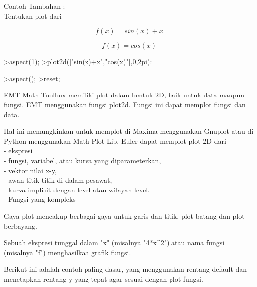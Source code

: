 \documentclass[12pt,arial,letterpaper]{book}
\begin{document}
\begin{eulercomment}
\begin{eulercomment}
\begin{eulercomment}
\begin{eulercomment}
\begin{eulercomment}
\begin{eulercomment}
\begin{eulercomment}
\begin{eulercomment}
\begin{eulercomment}
\begin{eulercomment}
\begin{eulercomment}
\begin{eulercomment}
\begin{eulercomment}
\begin{eulercomment}
\begin{eulercomment}
Contoh Tambahan :\\
Tentukan plot dari\\
\end{eulercomment}
\begin{eulerformula}
\[
f(x)=sin(x)+x
\]
\end{eulerformula}
\begin{eulerformula}
\[
f(x)=cos(x)
\]
\end{eulerformula}
\begin{eulerprompt}
>aspect(1);
>plot2d(["sin(x)+x","cos(x)"],0,2pi):
\end{eulerprompt}
\begin{eulerprompt}
>aspect();
>reset;
\end{eulerprompt}
\begin{eulercomment}
EMT Math Toolbox memiliki plot dalam bentuk 2D, baik untuk data maupun
fungsi. EMT menggunakan fungsi plot2d. Fungsi ini dapat memplot fungsi
dan data.

Hal ini memungkinkan untuk memplot di Maxima menggunakan Gnuplot atau
di Python menggunakan Math Plot Lib. Euler dapat memplot plot 2D dari\\
-   ekspresi\\
-   fungsi, variabel, atau kurva yang diparameterkan,\\
-   vektor nilai x-y,\\
-   awan titik-titik di dalam pesawat,\\
-   kurva implisit dengan level atau wilayah level.\\
-   Fungsi yang kompleks

Gaya plot mencakup berbagai gaya untuk garis dan titik, plot batang
dan plot berbayang.

\begin{eulercomment}
\begin{eulercomment}
Sebuah ekspresi tunggal dalam "x" (misalnya "4*x\textasciicircum{}2") atau nama fungsi
(misalnya "f") menghasilkan grafik fungsi.

Berikut ini adalah contoh paling dasar, yang menggunakan rentang
default dan menetapkan rentang y yang tepat agar sesuai dengan plot
fungsi.


\end{eulercomment}
\end{eulercomment}
\end{eulercomment}
\end{eulercomment}
\end{eulercomment}
\end{eulercomment}
\end{eulercomment}
\end{eulercomment}
\end{eulercomment}
\end{eulercomment}
\end{eulercomment}
\end{eulercomment}
\end{eulercomment}
\end{eulercomment}
\end{eulercomment}
\end{eulercomment}
\end{eulercomment}
\end{document}
